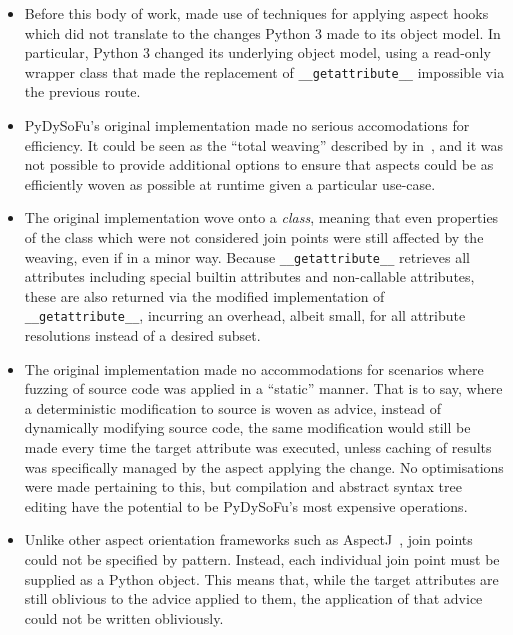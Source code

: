 \begin{itemize}
    \item Before this body of work, \pdsf made use of techniques for applying
    aspect hooks which did not translate to the changes Python 3 made to its
    object model. In particular, Python 3 changed its underlying object model,
    using a read-only wrapper class that made the replacement of
    \lstinline{__getattribute__} impossible via the previous route.
    \item PyDySoFu's original implementation made no serious accomodations for
    efficiency. It could be seen as the ``total weaving'' described by
    \citeauthor{dynamicAOchitchyan} in~\cite{dynamicAOchitchyan}, and it was not
    possible to provide additional options to ensure that aspects could be as
    efficiently woven as possible at runtime given a particular use-case.
    \item The original \pdsf implementation wove onto a \emph{class}, meaning
    that even properties of the class which were not considered join points were
    still affected by the weaving, even if in a minor way. Because
    \lstinline{__getattribute__} retrieves all attributes including special
    builtin attributes and non-callable attributes, these are also returned via
    the modified implementation of \lstinline{__getattribute__}, incurring an
    overhead, albeit small, for all attribute resolutions instead of a desired
    subset.
    \item The original \pdsf implementation made no accommodations for scenarios
    where fuzzing of source code was applied in a ``static'' manner. That is to
    say, where a deterministic modification to source is woven as advice,
    instead of dynamically modifying source code, the same modification would
    still be made every time the target attribute was executed, unless caching
    of results was specifically managed by the aspect applying the change. No
    optimisations were made pertaining to this, but compilation and abstract
    syntax tree editing have the potential to be PyDySoFu's most expensive
    operations.
    \item Unlike other aspect orientation frameworks such as
    AspectJ~\cite{aspectj_intro}, join points could not be specified by pattern.
    Instead, each individual join point must be supplied as a Python object.
    This means that, while the target attributes are still oblivious to the
    advice applied to them, the application of that advice could not be written
    obliviously.
\end{itemize}

